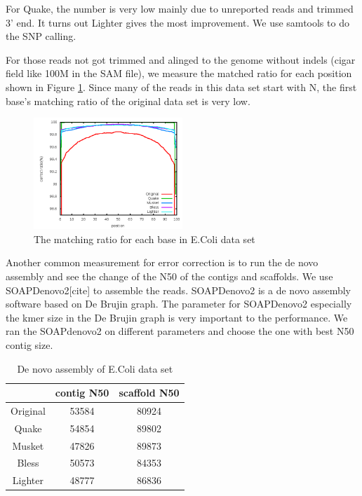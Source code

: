 \documentclass[10pt]{article}
\begin{document}
For Quake, the number is very low mainly due to unreported reads and trimmed 3' end. It turns out Lighter gives the most improvement. We use samtools to do the SNP calling. 

For those reads not got trimmed and alinged to the genome without indels (cigar field like 100M in the SAM file), we measure the matched ratio for each position shown in Figure \ref{fig:ecoli_perbase}. Since many of the reads in this data set start with N, the first base's matching ratio of the original data set is very low.

\begin{figure}[h!]
\begin{center}
\includegraphics[width=0.5\textwidth]{per_base.png}
\caption{The matching ratio for each base in E.Coli data set\label{fig:ecoli_perbase}}
\end{center}
\end{figure}

Another common measurement for error correction is to run the de novo assembly and see the change of the N50 of the contigs and scaffolds. We use SOAPDenovo2[cite] to assemble the reads. SOAPDenovo2 is a de novo assembly software based on De Brujin graph. The parameter for SOAPDenovo2 especially the kmer size in the De Brujin graph is very important to the performance. We ran the SOAPdenovo2 on different parameters and choose the one with best N50 contig size. 

\begin{table}
\begin{tabular}{|c|c|c|} \hline
	  & contig N50 & scaffold N50 \\ \hline 
Original  &	53584	&	80924 \\ \hline 
Quake &	54854	&	89802 \\ \hline 
Musket&	47826	&	89873 \\ \hline 
Bless &	50573	&	84353 \\ \hline 
Lighter &	48777	&	86836 \\ \hline 
\end{tabular}
\caption{De novo assembly of E.Coli data set\label{table:ecoli_sd2}}
\end{table}
\end{document}
